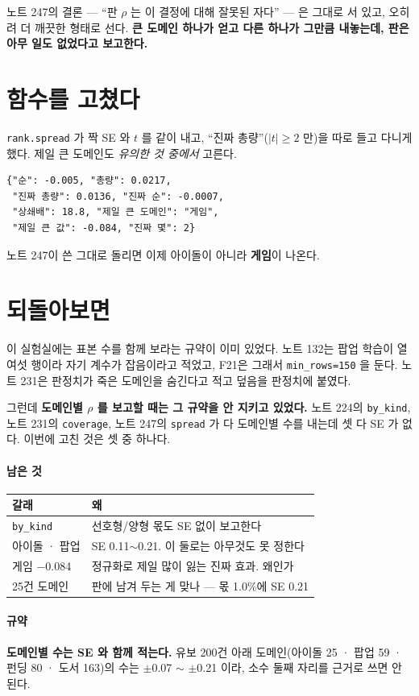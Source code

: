 \documentclass[10pt]{article}
\begin{document}
노트 247의 결론 --- ``판 $\rho$ 는 이 결정에 대해 잘못된 자다'' --- 은 그대로
서 있고, 오히려 더 깨끗한 형태로 선다. \textbf{큰 도메인 하나가 얻고 다른
하나가 그만큼 내놓는데, 판은 아무 일도 없었다고 보고한다.}

\section{함수를 고쳤다}

\texttt{rank.spread} 가 짝 SE 와 $t$ 를 같이 내고, ``진짜 총량''($|t| \ge 2$
만)을 따로 들고 다니게 했다. 제일 큰 도메인도 \emph{유의한 것 중에서} 고른다.

\begin{center}\small
\begin{verbatim}
{"순": -0.005, "총량": 0.0217,
 "진짜 총량": 0.0136, "진짜 순": -0.0007,
 "상쇄배": 18.8, "제일 큰 도메인": "게임",
 "제일 큰 값": -0.084, "진짜 몇": 2}
\end{verbatim}
\end{center}

노트 247이 쓴 그대로 돌리면 이제 아이돌이 아니라 \textbf{게임}이 나온다.

\section{되돌아보면}

이 실험실에는 표본 수를 함께 보라는 규약이 이미 있었다. 노트 132는 팝업
학습이 열여섯 행이라 자기 계수가 잡음이라고 적었고, F21은 그래서
\texttt{min\_rows=150} 을 둔다. 노트 231은 판정치가 죽은 도메인을 숨긴다고
적고 덮음을 판정치에 붙였다.

그런데 \textbf{도메인별 $\rho$ 를 보고할 때는 그 규약을 안 지키고 있었다.}
노트 224의 \texttt{by\_kind}, 노트 231의 \texttt{coverage}, 노트 247의
\texttt{spread} 가 다 도메인별 수를 내는데 셋 다 SE 가 없다. 이번에 고친
것은 셋 중 하나다.

\paragraph{남은 것}
\begin{center}\small
\begin{tabular}{ll}
\hline
갈래 & 왜 \\
\hline
\texttt{by\_kind} & 선호형/양형 몫도 SE 없이 보고한다 \\
아이돌 · 팝업 & SE 0.11$\sim$0.21. 이 둘로는 아무것도 못 정한다 \\
게임 $-$0.084 & 정규화로 제일 많이 잃는 진짜 효과. 왜인가 \\
25건 도메인 & 판에 남겨 두는 게 맞나 --- 몫 1.0\%에 SE 0.21 \\
\hline
\end{tabular}
\end{center}

\paragraph{규약} \textbf{도메인별 수는 SE 와 함께 적는다.} 유보 200건 아래
도메인(아이돌 25 · 팝업 59 · 펀딩 80 · 도서 163)의 수는 $\pm$0.07 $\sim$
$\pm$0.21 이라, 소수 둘째 자리를 근거로 쓰면 안 된다.
\end{document}
